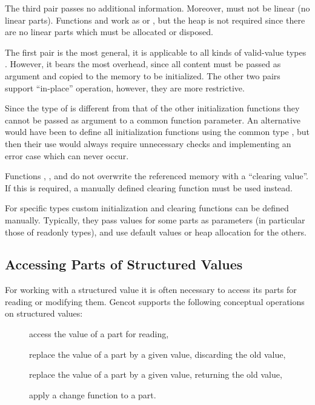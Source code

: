 The third pair passes no additional information. Moreover,  must not be linear (no linear parts). 
Functions  and  work as  or ,
but the heap is not required since there are no linear parts which must be allocated or disposed.

The first pair is the most general, it is applicable to all kinds of valid-value types . However, it bears the
most overhead, since all content must be passed as argument and copied to the memory to be initialized. The other
two pairs support ``in-place'' operation, however, they are more restrictive. 

Since the type of  is different from that of the other initialization functions they cannot 
be passed as argument to a common function parameter. An alternative would have been to define all initialization
functions using the common type , but then their use would always require unnecessary checks and
implementing an error case which can never occur.

Functions , , and  do not overwrite the referenced memory with a 
``clearing value''. If this is required, a manually defined clearing function must be used instead.

For specific types  custom initialization and clearing functions can be defined manually. Typically, they 
pass values for some parts as parameters (in particular those of readonly types), and use default values or heap
allocation for the others.

\subsection{Accessing Parts of Structured Values}
\label{design-operations-parts}

For working with a structured value it is often necessary to access its parts for reading or modifying them.
Gencot supports the following conceptual operations on structured values:
\begin{description}
  \item[] access the value of a part for reading,
  \item[] replace the value of a part by a given value, discarding the old value,
  \item[] replace the value of a part by a given value, returning the old value,
  \item[] apply a change function to a part.
\end{description}

